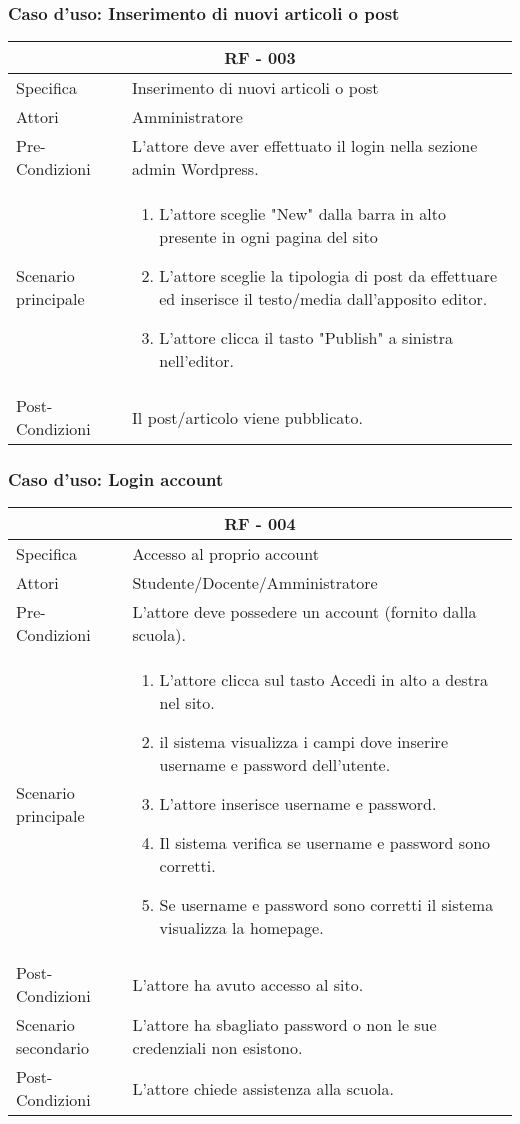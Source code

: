 \documentclass{article}
\begin{document}
\subsubsection{\textbf{Caso d'uso: Inserimento di nuovi articoli o post}}
\begin{tabular}{ |p{3cm}|p{9cm}|  }
	\hline
	\multicolumn{2}{|c|}{\textbf{RF - 003}} \\
	\hline
	Specifica& Inserimento di nuovi articoli o post\\
	\hline
	Attori& Amministratore\\
	\hline
	Pre-Condizioni& L'attore deve aver effettuato il login nella sezione admin Wordpress.\\
	\hline
	Scenario principale& \begin{enumerate}
		\item L'attore sceglie "New" dalla barra in alto presente in ogni pagina del sito
		\item L'attore sceglie la tipologia di post da effettuare ed inserisce il testo/media dall'apposito editor.
		\item L'attore clicca il tasto "Publish" a sinistra nell'editor.
	\end{enumerate}\\
	\hline
	Post-Condizioni& Il post/articolo viene pubblicato.\\
	\hline
\end{tabular}
\subsubsection{\textbf{Caso d'uso: Login account}}
\begin{tabular}{ |p{3cm}|p{9cm}|  }
	\hline
	\multicolumn{2}{|c|}{\textbf{RF - 004}} \\
	\hline
	Specifica& Accesso al proprio account\\
	\hline
	Attori& Studente/Docente/Amministratore\\
	\hline
	Pre-Condizioni& L'attore deve possedere un account (fornito dalla scuola).\\
	\hline
	Scenario principale& \begin{enumerate}
		\item L'attore clicca sul tasto Accedi in alto a destra nel sito.
		\item il sistema visualizza i campi dove inserire username e password dell'utente.
		\item L'attore inserisce username e password.
		\item Il sistema verifica se username e password sono corretti.
		\item Se username e password sono corretti il sistema visualizza la homepage.
	\end{enumerate}\\
	\hline
	Post-Condizioni& L'attore ha avuto accesso al sito.\\
	\hline
	Scenario secondario& L'attore ha sbagliato password o non le sue credenziali non esistono.\\
	\hline
	Post-Condizioni& L'attore chiede assistenza alla scuola.\\
	\hline
\end{tabular}
\end{document}

